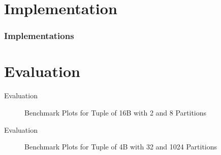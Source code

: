 \section{Implementation}
\begin{frame}
  \frametitle{Implementations}
\end{frame}

\section{Evaluation}
\begin{frame}{Evaluation}
  \begin{figure}[h]
    \centering
    \begin{subfigure}{.49\textwidth}
      \centering
      \resizebox{\linewidth}{!}{}
    \end{subfigure}
    \begin{subfigure}{.49\textwidth}
      \centering
      \resizebox{\linewidth}{!}{}
    \end{subfigure}
    \begin{subfigure}{\textwidth}
      \centering
      \resizebox{\linewidth}{!}{}
    \end{subfigure}
    \caption[Shuffle Benchmark Plots for Tuple of 16B with 2 and 8 Partitions]{Benchmark Plots for Tuple of 16B with 2 and 8 Partitions}
    \label{plot-shuffle-16B-2-8}
  \end{figure}
\end{frame}

\begin{frame}{Evaluation}
  \begin{figure}[h]
    \centering
    \begin{subfigure}{.49\textwidth}
      \centering
      \resizebox{\linewidth}{!}{}
    \end{subfigure}
    \begin{subfigure}{.49\textwidth}
      \centering
      \resizebox{\linewidth}{!}{}
    \end{subfigure}
    \begin{subfigure}{\textwidth}
      \centering
      \resizebox{\linewidth}{!}{}
    \end{subfigure}
    \caption[Shuffle Benchmark Plots for Tuple of 4B with 32 and 1024 Partitions]{Benchmark Plots for Tuple of 4B with 32 and 1024 Partitions}
    \label{plot-shuffle-4B-32-1024}
  \end{figure}
\end{frame}

